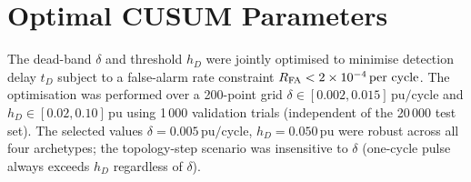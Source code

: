 \documentclass[journal]{IEEEtran}
\begin{document}
\appendix

\section{Optimal CUSUM Parameters}
\label{app:cusum}

The dead-band $\delta$ and threshold $h_D$ were jointly optimised
to minimise detection delay $t_D$ subject to a false-alarm rate
constraint $R_{\rm FA} < 2\times10^{-4}\,\text{per cycle}$.  The
optimisation was performed over a 200-point grid $\delta \in
[0.002, 0.015]\,\text{pu/cycle}$ and $h_D \in [0.02, 0.10]\,\text{pu}$
using 1\,000 validation trials (independent of the 20\,000 test set).
The selected values $\delta = 0.005\,\text{pu/cycle}$,
$h_D = 0.050\,\text{pu}$ were robust across all four archetypes;
the topology-step scenario was insensitive to $\delta$ (one-cycle
pulse always exceeds $h_D$ regardless of $\delta$).



\end{document}
